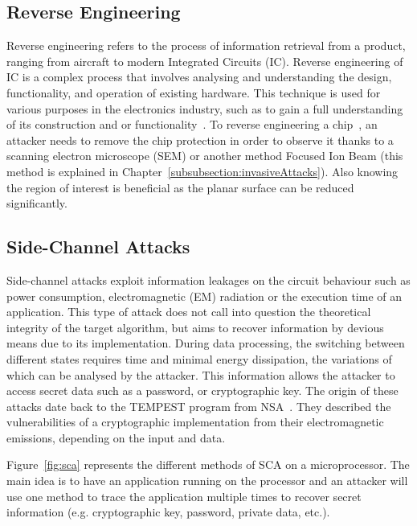 \subsection{Reverse Engineering}
Reverse engineering refers to the process of information retrieval from a product, ranging from aircraft to modern Integrated Circuits (IC). Reverse engineering of IC is a complex process that involves analysing and understanding the design, functionality, and operation of existing hardware. This technique is used for various purposes in the electronics industry, such as to gain a full understanding of its construction and or functionality~\cite{QCFASWCT-16-emergTech}.
To reverse engineering a chip~\cite{FSKWERP-17-ivsw}, an attacker needs to remove the chip protection in order to observe it thanks to a scanning electron microscope (SEM) or another method Focused Ion Beam (this method is explained in Chapter~\ref{subsubsection:invasiveAttacks}). Also knowing the region of interest is beneficial as the planar surface can be reduced significantly.

\subsection{Side-Channel Attacks}
Side-channel attacks exploit information leakages on the circuit behaviour such as power consumption, electromagnetic (EM) radiation or the execution time of an application.
This type of attack does not call into question the theoretical integrity of the target algorithm, but aims to recover information by devious means due to its implementation. During data processing, the switching between different states requires time and minimal energy dissipation, the variations of which can be analysed by the attacker.
This information allows the attacker to access secret data such as a password, or cryptographic key. The origin of these attacks date back to the \mbox{TEMPEST} program from NSA~\cite{F-72-nsa}. They described the vulnerabilities of a cryptographic implementation from their electromagnetic emissions, depending on the input and data.

Figure~\ref{fig:sca} represents the different methods of SCA on a microprocessor. The main idea is to have an application running on the processor and an attacker will use one method to trace the application multiple times to recover secret information (e.g. cryptographic key, password, private data, etc.).

